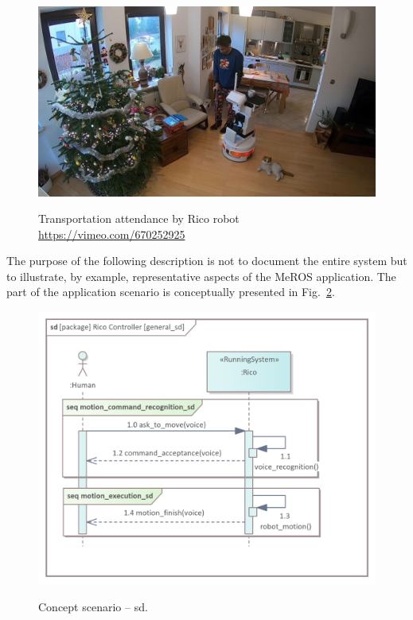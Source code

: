 \documentclass[11pt,oneside,a4paper]{article}
\begin{document}
	\begin{figure}[H]
		\centering
		\begin{center}
			{\includegraphics[width=.9\columnwidth]{img/herbatka_u_winiara.jpg}}
		\end{center}
		\caption{Transportation attendance by Rico robot \url{https://vimeo.com/670252925}} 
		\label{fig:herbatka_u_winiara}
	\end{figure}
	
	
	\pagebreak
	
	 The purpose of the following description is not to document the entire system but to illustrate, by example, representative aspects of the MeROS application.
		The part of the application scenario is conceptually presented in Fig.~\ref{fig:general_sd}.
	

	\begin{figure}[H] 
		\centering
		\begin{center}
			{\includegraphics[scale=0.9]{img/rico_pkg/general_sd.png}}
		\end{center}
		\caption{Concept scenario -- sd.} 
		\label{fig:general_sd}
	\end{figure}
	
\end{document}
